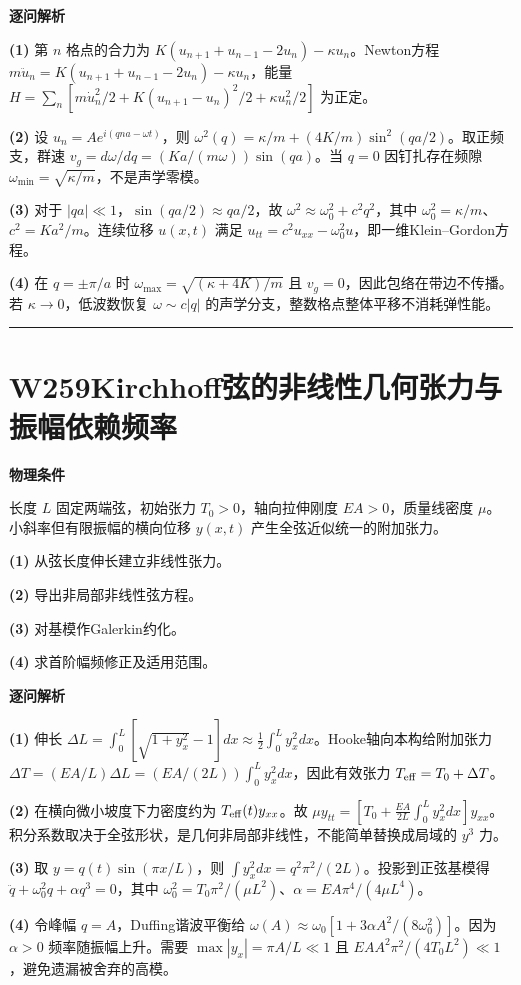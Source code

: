 \documentclass[UTF8,a4paper,11pt,oneside,openany]{ctexbook}
\begin{document}
\par\medskip\noindent\textbf{逐问解析}
\par\noindent\textbf{(1)} 第 \(n\) 格点的合力为 \(K(u_{n+1}+u_{n-1}-2u_n)-\kappa u_n\)。Newton方程 \(m\ddot u_n=K(u_{n+1}+u_{n-1}-2u_n)-\kappa u_n\)，能量 \(H=\sum_n[m\dot u_n^2/2+K(u_{n+1}-u_n)^2/2+\kappa u_n^2/2]\) 为正定。
\par\noindent\textbf{(2)} 设 \(u_n=Ae^{i(qna-\omega t)}\)，则 \(\omega^2(q)=\kappa/m+(4K/m)\sin^2(qa/2)\)。取正频支，群速 \(v_g=d\omega/dq=(Ka/(m\omega))\sin(qa)\)。当 \(q=0\) 因钉扎存在频隙 \(\omega_{\min}=\sqrt{\kappa/m}\)，不是声学零模。
\par\noindent\textbf{(3)} 对于 \(|qa|\ll1\)，\(\sin(qa/2)\approx qa/2\)，故 \(\omega^2\approx\omega_0^2+c^2q^2\)，其中 \(\omega_0^2=\kappa/m\)、\(c^2=Ka^2/m\)。连续位移 \(u(x,t)\) 满足 \(u_{tt}=c^2u_{xx}-\omega_0^2u\)，即一维Klein–Gordon方程。
\par\noindent\textbf{(4)} 在 \(q=\pm\pi/a\) 时 \(\omega_{\max}=\sqrt{(\kappa+4K)/m}\) 且 \(v_g=0\)，因此包络在带边不传播。若 \(\kappa\to0\)，低波数恢复 \(\omega\sim c|q|\) 的声学分支，整数格点整体平移不消耗弹性能。

\par\bigskip\hrule\bigskip
\section*{W259\quad Kirchhoff弦的非线性几何张力与振幅依赖频率}
\textbf{物理条件}\par 长度 \(L\) 固定两端弦，初始张力 \(T_0>0\)，轴向拉伸刚度 \(EA>0\)，质量线密度 \(\mu\)。小斜率但有限振幅的横向位移 \(y(x,t)\) 产生全弦近似统一的附加张力。
\par\noindent\textbf{(1)} 从弦长度伸长建立非线性张力。
\par\noindent\textbf{(2)} 导出非局部非线性弦方程。
\par\noindent\textbf{(3)} 对基模作Galerkin约化。
\par\noindent\textbf{(4)} 求首阶幅频修正及适用范围。

\par\medskip\noindent\textbf{逐问解析}
\par\noindent\textbf{(1)} 伸长 \(\Delta L=\int_0^L[\sqrt{1+y_x^2}-1]dx\approx\frac12\int_0^Ly_x^2dx\)。Hooke轴向本构给附加张力 \(\Delta T=(EA/L)\Delta L=(EA/(2L))\int_0^Ly_x^2dx\)，因此有效张力 \(T_{\rm eff}=T_0+\Delta T\)。
\par\noindent\textbf{(2)} 在横向微小坡度下力密度约为 \(T_{\rm eff}(t)y_{xx}\)。故 \(\mu y_{tt}=[T_0+\frac{EA}{2L}\int_0^Ly_x^2dx]y_{xx}\)。积分系数取决于全弦形状，是几何非局部非线性，不能简单替换成局域的 \(y^3\) 力。
\par\noindent\textbf{(3)} 取 \(y=q(t)\sin(\pi x/L)\)，则 \(\int y_x^2dx=q^2\pi^2/(2L)\)。投影到正弦基模得 \(\ddot q+\omega_0^2q+\alpha q^3=0\)，其中 \(\omega_0^2=T_0\pi^2/(\mu L^2)\)、\(\alpha=EA\pi^4/(4\mu L^4)\)。
\par\noindent\textbf{(4)} 令峰幅 \(q=A\)，Duffing谐波平衡给 \(\omega(A)\approx\omega_0[1+3\alpha A^2/(8\omega_0^2)]\)。因为 \(\alpha>0\) 频率随振幅上升。需要 \(\max|y_x|=\pi A/L\ll1\) 且 \(EA A^2\pi^2/(4T_0L^2)\ll1\)，避免遗漏被舍弃的高模。
\end{document}

